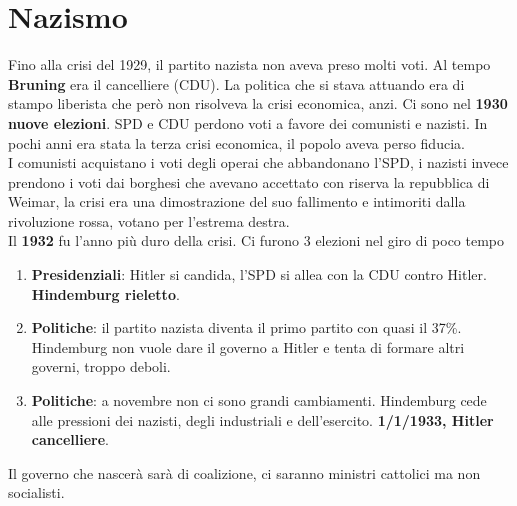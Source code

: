 
\section{Nazismo}
Fino alla crisi del 1929, il partito nazista non aveva preso molti voti. Al tempo \textbf{Bruning} 
era il cancelliere (CDU). La politica che si stava attuando era di stampo liberista che però non
risolveva la crisi economica, anzi. Ci sono nel \textbf{1930 nuove elezioni}. SPD e CDU perdono voti
a favore dei comunisti e nazisti. In pochi anni era stata la terza crisi economica, il popolo aveva
perso fiducia.\\
I comunisti acquistano i voti degli operai che abbandonano l'SPD, i nazisti invece prendono i voti
dai borghesi che avevano accettato con riserva la repubblica di Weimar, la crisi era una 
dimostrazione del suo fallimento e intimoriti dalla rivoluzione rossa, votano per l'estrema destra.\\
Il \textbf{1932} fu l'anno più duro della crisi. Ci furono 3 elezioni nel giro di poco tempo
\begin{enumerate}
  \item \textbf{Presidenziali}: Hitler si candida, l'SPD si allea con la CDU contro Hitler. 
    \textbf{Hindemburg rieletto}.
  \item \textbf{Politiche}: il partito nazista diventa il primo partito con quasi il 37\%. Hindemburg
    non vuole dare il governo a Hitler e tenta di formare altri governi, troppo deboli.
  \item \textbf{Politiche}: a novembre non ci sono grandi cambiamenti. Hindemburg cede alle pressioni
    dei nazisti, degli industriali e dell'esercito. \textbf{1/1/1933, Hitler cancelliere}. 
\end{enumerate}
Il governo che nascerà sarà di coalizione, ci saranno ministri cattolici ma non socialisti.

